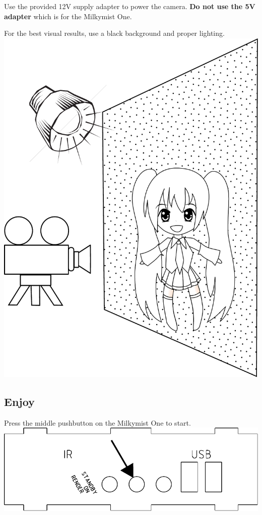 \documentclass{leaflet}
\begin{document}
Use the provided 12V supply adapter to power the camera. \textbf{Do not use the 5V adapter} which is for the Milkymist One.

For the best visual results, use a black background and proper lighting.
\includegraphics[width=\textwidth]{camsetup.pdf}

\subsection{Enjoy}
Press the middle pushbutton on the Milkymist One to start.
\includegraphics[width=\textwidth]{midpb.pdf}
\end{document}
